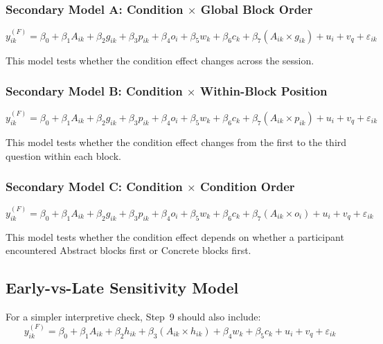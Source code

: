 \subsubsection{Secondary Model A: Condition $\times$ Global Block Order}
\begin{equation}
y^{(F)}_{ik}
=
\beta_0
+
\beta_1 A_{ik}
+
\beta_2 g_{ik}
+
\beta_3 p_{ik}
+
\beta_4 o_i
+
\beta_5 w_k
+
\beta_6 c_k
+
\beta_7 (A_{ik} \times g_{ik})
+
u_i
+
v_q
+
\varepsilon_{ik}
\end{equation}

This model tests whether the condition effect changes across the session.

\subsubsection{Secondary Model B: Condition $\times$ Within-Block Position}
\begin{equation}
y^{(F)}_{ik}
=
\beta_0
+
\beta_1 A_{ik}
+
\beta_2 g_{ik}
+
\beta_3 p_{ik}
+
\beta_4 o_i
+
\beta_5 w_k
+
\beta_6 c_k
+
\beta_7 (A_{ik} \times p_{ik})
+
u_i
+
v_q
+
\varepsilon_{ik}
\end{equation}

This model tests whether the condition effect changes from the first to the third question within each block.

\subsubsection{Secondary Model C: Condition $\times$ Condition Order}
\begin{equation}
y^{(F)}_{ik}
=
\beta_0
+
\beta_1 A_{ik}
+
\beta_2 g_{ik}
+
\beta_3 p_{ik}
+
\beta_4 o_i
+
\beta_5 w_k
+
\beta_6 c_k
+
\beta_7 (A_{ik} \times o_i)
+
u_i
+
v_q
+
\varepsilon_{ik}
\end{equation}

This model tests whether the condition effect depends on whether a participant encountered
Abstract blocks first or Concrete blocks first.

\subsection{Early-vs-Late Sensitivity Model}
For a simpler interpretive check, Step~9 should also include:
\begin{equation}
y^{(F)}_{ik}
=
\beta_0
+
\beta_1 A_{ik}
+
\beta_2 h_{ik}
+
\beta_3 (A_{ik} \times h_{ik})
+
\beta_4 w_k
+
\beta_5 c_k
+
u_i
+
v_q
+
\varepsilon_{ik}
\end{equation}

